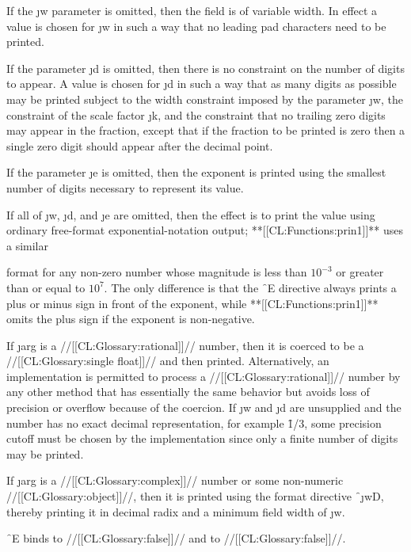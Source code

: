 If the \j{w} parameter is omitted, then the field is of variable width.
In effect a value is chosen
for \j{w} in such a way that no leading pad characters need to be printed.


If the parameter \j{d} is omitted, then there is no constraint
on the number of digits to appear.
A value is chosen for \j{d} in such a way that as many digits
as possible may be printed subject to the width constraint
imposed by the parameter \j{w}, the constraint of the scale factor \j{k},
and the constraint that no trailing
zero digits may appear in the fraction, except that if the
fraction to be printed is zero then a single zero digit should
appear after the decimal point.


If the parameter \j{e} is omitted, then the exponent is printed
using the smallest number of digits necessary to represent its value.


If all of \j{w}, \j{d}, and \j{e} are omitted, then the effect is to print
the value using ordinary free-format exponential-notation output;
**[[CL:Functions:prin1]]** uses 
a similar

format for any non-zero number whose magnitude
is less than $10^{-3}$ or greater than or equal to $10^7$.
The only difference is that the \f{~E} 
directive always prints a plus or minus sign in front of the
    exponent, while **[[CL:Functions:prin1]]** omits the plus sign if the exponent is
    non-negative.



If \j{arg} is a //[[CL:Glossary:rational]]// 
number, then it is coerced to be a //[[CL:Glossary:single float]]//
and then printed.  Alternatively, an implementation is permitted to
process a //[[CL:Glossary:rational]]// 
number by any other method that has essentially the
same behavior but avoids loss of precision or overflow
because of the coercion.  If \j{w} and \j{d} are
unsupplied and the number has no exact decimal representation,
for example \f{1/3}, some precision cutoff must be chosen
by the implementation since only a finite number of digits may be printed.


If \j{arg} is a //[[CL:Glossary:complex]]// number or some non-numeric
//[[CL:Glossary:object]]//, 
then it is printed using the format directive \f{~\j{w}D},
thereby printing it in decimal radix and a minimum field width of \j{w}.

\f{~E} binds
      to //[[CL:Glossary:false]]//
 and  to //[[CL:Glossary:false]]//.



